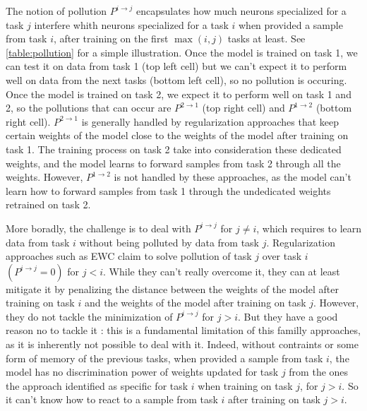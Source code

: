 \documentclass[11pt]{article}
\begin{document}
\vspace{1mm}
\noindent
The notion of pollution $P^{i\rightarrow j}$ encapsulates how much neurons specialized for a task $j$ interfere whith neurons specialized for a task $i$ when provided a sample from task $i$, after training on the first $\max(i,j)$ tasks at least. See \ref{table:pollution} for a simple illustration. Once the model is trained on task 1, we can test it on data from task 1 (top left cell) but we can't expect it to perform well on data from the next tasks (bottom left cell), so no pollution is occuring. Once the model is trained on task 2, we expect it to perform well on task 1 and 2, so the pollutions that can occur are $P^{2\rightarrow 1}$ (top right cell) and $P^{1\rightarrow 2}$ (bottom right cell). $P^{2\rightarrow 1}$ is generally handled by regularization approaches that keep certain weights of the model close to the weights of the model after training on task 1. The training process on task 2 take into consideration these dedicated weights, and the model learns to forward samples from task 2 through all the weights. However, $P^{1\rightarrow 2}$ is not handled by these approaches, as the model can't learn how to forward samples from task 1 through the undedicated weights retrained on task 2.

\vspace{1mm}
\noindent
More boradly, the challenge is to deal with $P^{i\rightarrow j}$ for $j \neq i$, which requires to learn data from task $i$ without being polluted by data from task $j$. Regularization approaches such as EWC claim to solve pollution of task $j$ over task $i$ $(P^{i\rightarrow j}=0)$ for $j<i$. While they can't really overcome it, they can at least mitigate it by penalizing the distance between the weights of the model after training on task $i$ and the weights of the model after training on task $j$. However, they do not tackle the minimization of $P^{i\rightarrow j}$ for $j>i$. But they have a good reason no to tackle it : this is a fundamental limitation of this familly approaches, as it is inherently not possible to deal with it. Indeed, without contraints or some form of memory of the previous tasks, when provided a sample from task $i$, the model has no discrimination power of weights updated for task $j$ from the ones the approach identified as specific for task $i$ when training on task $j$, for $j>i$. So it can't know how to react to a sample from task $i$ after training on task $j>i$.
\end{document}
